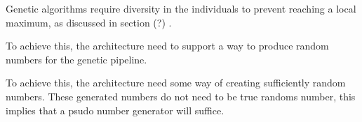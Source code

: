 Genetic algorithms require diversity in the individuals to prevent reaching a local maximum, as discussed in section (?) . 






To achieve this, the architecture need to support a way to produce random numbers for the genetic pipeline.   


To achieve this, the architecture need some way of creating sufficiently random numbers. These generated numbers do not need to be true randoms number, this implies that a psudo number generator will suffice. 

